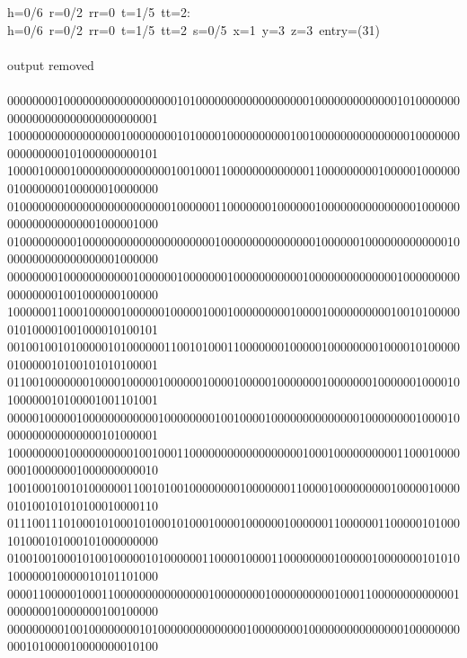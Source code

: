 \begin{tabbing}
h=0/6\ r=0/2\ rr=0\ t=1/5\ tt=2:\\[0pt]
h=0/6\ r=0/2\ rr=0\ t=1/5\ tt=2\ s=0/5\ x=1\ y=3\ z=3\ entry=(31)\\[0pt]
\\
output removed\\
\\
000000001000000000000000000101000000000000000000100000000000001010000000000000000000000000000001\\[0pt]
100000000000000000100000000101000010000000000100100000000000000010000000000000000101000000000101\\[0pt]
100001000010000000000000001001000110000000000000110000000001000001000000010000000100000010000000\\[0pt]
010000000000000000000000001000000110000000100000010000000000000001000000000000000000001000001000\\[0pt]
010000000001000000000000000000000100000000000000010000001000000000000010000000000000000001000000\\[0pt]
000000001000000000001000000100000001000000000001000000000000001000000000000000001001000000100000\\[0pt]
100000011000100000100000010000010001000000000100001000000000010010100000010100001001000010100101\\[0pt]
001001001010000010100000011001010001100000001000001000000001000010100000010000010100101010100001\\[0pt]
011001000000010000100000100000010000100000100000001000000010000001000010100000010100001001101001\\[0pt]
000001000001000000000000100000000100100001000000000000001000000001000010000000000000000101000001\\[0pt]
100000000100000000001001000110000000000000000001000100000000001100010000000100000001000000000010\\[0pt]
100100010010100000011001010010000000010000000110000100000000010000010000010100101010100010000110\\[0pt]
011100111010001010001010001010001000010000001000000110000001100000101000101000101000101000000000\\[0pt]
010010010001010010000010100000011000010000110000000010000010000000101010100000010000010101101000\\[0pt]
000011000001000110000000000000001000000001000000000010001100000000000001000000010000000100100000\\[0pt]
000000000100100000000101000000000000001000000001000000000000000100000000000101000010000000010100\\[0pt]

\end{tabbing}
